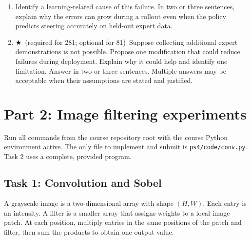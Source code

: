 \documentclass[11pt]{article}
\newcommand{\gradstar}{$\bigstar$~\textsf{\small (required for 281; optional for 81)}~}
\newenvironment{studentanswer}[1]
  {\par\medskip\noindent
   \begin{tcolorbox}[height from=#1 to 100cm, colback=white, colframe=gray!60,
     boxrule=0.6pt, arc=0pt, outer arc=0pt, left=7pt, right=7pt,
     top=7pt, bottom=7pt, title={Answer / work}, fonttitle=\small,
     coltitle=black, colbacktitle=gray!8, titlerule=0pt]
   \ignorespaces}
  {\end{tcolorbox}\par}
\begin{document}
\begin{enumerate}[label=(\alph*)]

\item \begin{minipage}[t]{\linewidth}
Identify a learning-related cause of this failure. In two or three
sentences, explain why the errors can grow during a rollout even when
the policy predicts steering accurately on held-out expert data.

\begin{studentanswer}{3.5cm}

\end{studentanswer}

\end{minipage}

\item \begin{minipage}[t]{\linewidth} \gradstar Suppose collecting additional expert demonstrations is not
possible. Propose one modification that could reduce failures during
deployment. Explain why it could help and identify one limitation. Answer
in two or three sentences. Multiple answers may be acceptable when their
assumptions are stated and justified.

\begin{studentanswer}{4cm}
\end{studentanswer}

\end{minipage}
\end{enumerate}

\clearpage
\section{Part 2: Image filtering experiments}
Run all commands from the course repository root with the course Python
environment active. The only file to implement and submit is
\texttt{ps4/code/conv.py}. Task 2 uses a complete, provided program.

\subsection{Task 1: Convolution and Sobel}
A grayscale image is a two-dimensional array with shape $(H,W)$.
Each entry is an intensity. A filter is a smaller array that assigns
weights to a local image patch. At each position, multiply entries
in the same positions of the patch and filter, then sum the products
to obtain one output value.
\end{document}
